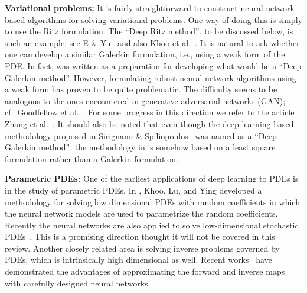 \documentclass[12pt,AutoFakeBold,AutoFakeSlant]{article}
\theoremstyle{definition}
\begin{document}
	\vspace{.1in}   
	\noindent
	{\bf Variational problems:}
	It is fairly straightforward to construct neural network-based algorithms for solving variational problems.  One way of doing this is
	simply to use the Ritz formulation. The {``Deep Ritz} method'', to be discussed below, is such an example; 
	see E \& Yu~\cite{E2018deep} and also Khoo et al.\ \cite{Khoo2019solving}.
	It is natural to ask whether one can develop a similar Galerkin formulation,  i.e., 
	using a weak form of the PDE. In fact, \cite{E2018deep} was written
	as a preparation for developing what would be a ``Deep Galerkin method''. 
	However, formulating robust neural network algorithms using
	a weak form has proven to be quite problematic.  The difficulty seems to be analogous to the ones encountered in 
	generative adversarial networks (GAN); cf.\ Goodfellow et al.\ \cite{Goodfellow2014generative}. 
	For some progress in this direction we refer to the article Zhang et al.\ \cite{Zang2020weak}.
	It should also be noted that even though the deep learning-based methodology proposed in 
	Sirignano \& Spiliopoulos~\cite{Sirignano2018dgm} was named as a 
	``Deep Galerkin method'', the methodology in \cite{Sirignano2018dgm} 
	is somehow based on a least square formulation rather than a Galerkin formulation. 

	\vspace{.1in}
	\noindent
	{\bf Parametric PDEs:}
	One of the earliest applications of deep learning to PDEs is in the study of parametric PDEs.
	In \cite{Khoo2020solving}, Khoo, Lu, and Ying developed a methodology for solving low dimensional
	PDEs with random coefficients in which the neural network models are used to parametrize the random coefficients. Recently the neural networks are also applied to solve low-dimensional stochastic PDEs~\cite{zhang2020learning}.
	This is a promising direction thought it will not be covered in this review.
	Another closely related area is solving inverse problems governed by PDEs, which is intrinsically high dimensional as well. Recent works~\cite{raissi2019physics,fan2019solving,fan2020solving,khoo2019switchnet,chen2020physics} have demonstrated the advantages of approximating the forward and inverse maps with carefully designed neural networks.
\end{document}
